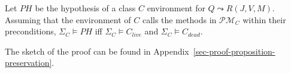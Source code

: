\begin{lemma}
\label{prop-preservation}
Let $PH$ be the hypothesis of a class $C$ environment for  $Q \leadsto R (J,V,M)$. 
Assuming that the environment of $C$ calls the methods in
$\mathcal{PM}_C$ within their preconditions, %
$\Sigma_C \models PH$ iff $\Sigma_{C} \models C_{live}$ and $\Sigma_{C} \models C_{dead}$.
\end{lemma}
The sketch of the proof 
can be found in Appendix~\ref{sec-proof-proposition-preservation}. 






